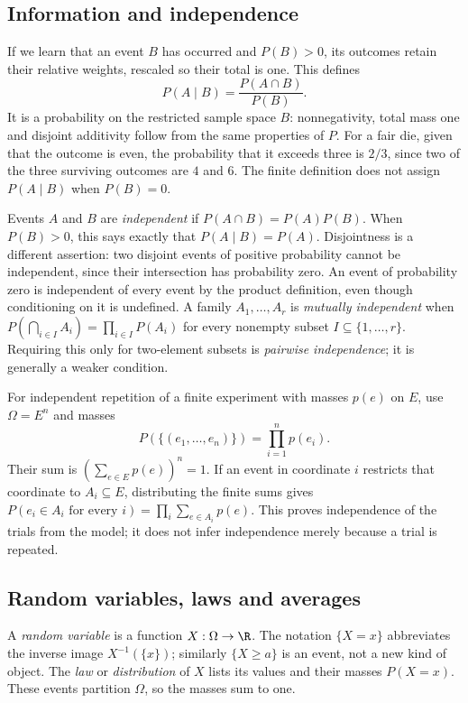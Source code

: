 \subsection{Information and independence}
If we learn that an event $B$ has occurred and $P(B)>0$, its outcomes retain
their relative weights, rescaled so their total is one. This defines
\[
 P(A\mid B)=\frac{P(A\cap B)}{P(B)}.
\]
It is a probability on the restricted sample space $B$: nonnegativity,
total mass one and disjoint additivity follow from the same properties of $P$.
For a fair die, given that the outcome is even, the probability that it exceeds
three is $2/3$, since two of the three surviving outcomes are $4$ and $6$.
The finite definition does not assign $P(A\mid B)$ when $P(B)=0$.

Events $A$ and $B$ are \emph{independent} if
$P(A\cap B)=P(A)P(B)$. When $P(B)>0$, this says exactly that
$P(A\mid B)=P(A)$. Disjointness is a different assertion: two disjoint
events of positive probability cannot be independent, since their intersection
has probability zero. An event of probability zero is independent of every
event by the product definition, even though conditioning on it is undefined.
A family $A_1,\ldots,A_r$ is \emph{mutually independent} when
$P(\bigcap_{i\in I}A_i)=\prod_{i\in I}P(A_i)$ for every nonempty subset
$I\subseteq\{1,\ldots,r\}$. Requiring this only for two-element subsets
is \emph{pairwise independence}; it is generally a weaker condition.

For independent repetition of a finite experiment with masses $p(e)$ on $E$,
use $\Omega=E^n$ and masses
\[
 P(\{(e_1,\ldots,e_n)\})=\prod_{i=1}^n p(e_i).
\]
Their sum is $(\sum_{e\in E}p(e))^n=1$. If an event in coordinate $i$
restricts that coordinate to $A_i\subseteq E$, distributing the finite sums
gives $P(e_i\in A_i\text{ for every }i)=\prod_i\sum_{e\in A_i}p(e)$.
This proves independence of the trials from the model; it does not infer
independence merely because a trial is repeated.

\subsection{Random variables, laws and averages}
A \emph{random variable} is a function $X:\Omega\to\R$. The notation
$\{X=x\}$ abbreviates the inverse image $X^{-1}(\{x\})$; similarly
$\{X\ge a\}$ is an event, not a new kind of object. The \emph{law} or
\emph{distribution} of $X$ lists its values and their masses $P(X=x)$.
These events partition $\Omega$, so the masses sum to one.

